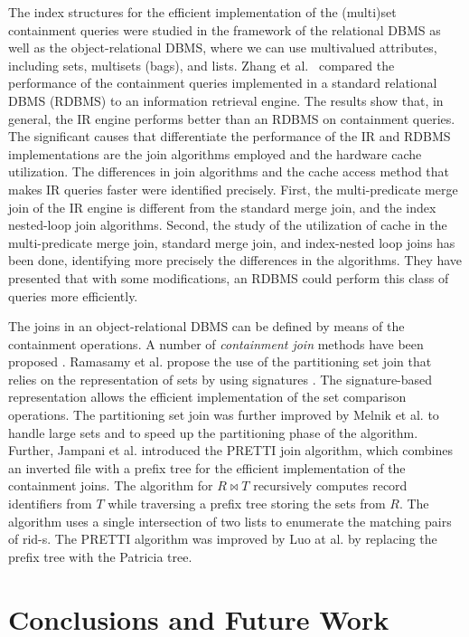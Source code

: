 \documentclass[algorithms,article,accept,pdftex,moreauthors]{Definitions/mdpi}
\begin{document}
The index structures for the efficient implementation of the (multi)set containment queries were studied in the framework of the relational DBMS as well as the object-relational DBMS, where we can use multivalued attributes, including sets, multisets (bags), and lists. Zhang et al.\ \cite{Zhang2001} compared the performance of the containment queries implemented in a standard relational DBMS (RDBMS) to an information retrieval engine. The results show that, in general, the IR engine performs better than an RDBMS on containment queries. The significant causes that differentiate the performance of the IR and RDBMS implementations are the join algorithms employed and the hardware cache utilization. The differences in join algorithms and the cache access method that makes IR queries faster were identified precisely. First, the multi-predicate merge join of the IR engine is different from the standard merge join, and the index nested-loop join algorithms. Second, the study of the utilization of cache in the multi-predicate merge join, standard merge join, and index-nested loop joins has been done, identifying more precisely the differences in the algorithms. They have presented that with some modifications, an RDBMS could perform this class of queries more efficiently. 

The joins in an object-relational DBMS can be defined by means of the containment operations. A number of \emph{containment join} methods have been proposed \cite{Ramasamy2000,Melnik2003,Jampani2005,Luo2015}. Ramasamy et al. propose the use of the partitioning set join that relies on the representation of sets by using signatures \cite{Ramasamy2000}. The signature-based representation allows the efficient implementation of the set comparison operations. The partitioning set join was further improved by Melnik et al. \cite{Melnik2003} to handle large sets and to speed up the partitioning phase of the algorithm. Further, Jampani et al. introduced the PRETTI join algorithm, which combines an inverted file with a prefix tree for the efficient implementation of the containment joins. The algorithm for $R\bowtie T$ recursively computes record identifiers from $T$ while traversing a prefix tree storing the sets from $R$. The algorithm uses a single intersection of two lists to enumerate the matching pairs of rid-s. The PRETTI algorithm was improved by Luo at al. \cite{Luo2015} by replacing the prefix tree with the Patricia tree. 

%
\section{Conclusions and Future Work} \label{c:conclusions}
\end{document}

